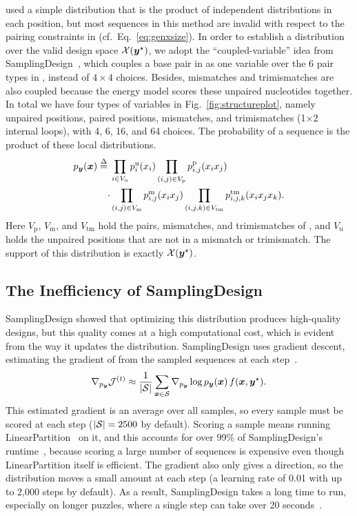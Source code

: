 \citet{matthies2023} used a simple distribution that is the product of independent distributions in each position, but most sequences in this method are invalid with respect to the pairing constraints in \vecystar (cf.~Eq.~\ref{eq:genxsize}).
In order to establish a distribution over the valid design space
$\mathcal{X}(\boldsymbol{{y}}^\star)$,
we adopt the ``coupled-variable'' idea 
from SamplingDesign~\citep{tang2026}, which couples a base pair in \vecystar as one variable over the 6 pair types in \pairset,
instead of
 $4\times 4$ choices.
Besides, mismatches and trimismatches are also coupled because the energy model scores these unpaired nucleotides together. 
In total we have
four types of variables in Fig.~\ref{fig:structureplot}, namely unpaired positions, paired positions, mismatches, and trimismatches (1$\times$2 internal loops), with 4, 6, 16, and 64 choices.
The probability of a sequence is the product of these local distributions.
\begin{equation}
\begin{aligned}
p_{\boldsymbol{{y}}}(\boldsymbol{{x}})\stackrel{\Delta}{=}{}&\prod_{i\in V_{\mathrm{u}}}p^{\mathrm{u}}_i(x_i)\prod_{(i,j)\in V_{\mathrm{p}}}p^{\mathrm{p}}_{i,j}(x_ix_j)\\
\cdot{}&\prod_{(i,j)\in V_{\mathrm{m}}}p^{\mathrm{m}}_{i,j}(x_ix_j)\prod_{(i,j,k)\in V_{\mathrm{tm}}}p^{\mathrm{tm}}_{i,j,k}(x_ix_jx_k).
\end{aligned}
\label{eq:factorization}
\end{equation}
Here $V_{\mathrm{p}}$, $V_{\mathrm{m}}$, and $V_{\mathrm{tm}}$ hold the pairs, mismatches, and trimismatches of \vecystar, and $V_{\mathrm{u}}$ holds the unpaired positions that are not in a mismatch or trimismatch. 
The support of this distribution is exactly $\mathcal{X}(\boldsymbol{{y}}^\star)$.

\subsection{The Inefficiency of SamplingDesign}\label{sec:samplingdesign}
SamplingDesign showed that optimizing this distribution produces high-quality designs, but this quality comes at a high computational cost, which is evident from the way it updates the distribution. SamplingDesign uses gradient descent, estimating the gradient of \obj from the sampled sequences at each step~\citep{tang2026}.
\begin{equation}
\nabla_{p_{\boldsymbol{{y}}}}\mathcal{J}^{(t)}\approx\frac{1}{|\mathcal{S}|}\sum_{\boldsymbol{{x}}\in\mathcal{S}}\nabla_{p_{\boldsymbol{{y}}}}\log p_{\boldsymbol{{y}}}(\boldsymbol{{x}})\,f(\boldsymbol{{x}},\boldsymbol{{y}}^\star).
\label{eq:gradient}
\end{equation}
This estimated gradient is an average over all samples, so every sample must be scored at each step ($|\mathcal{S}|=2500$ by default). Scoring a sample means running LinearPartition~\citep{zhang2020} on it, and this accounts for over 99\% of SamplingDesign's runtime~\citep{tang2026}, because scoring a large number of sequences is expensive even though LinearPartition itself is efficient. The gradient also only gives a direction, so the distribution moves a small amount at each step (a learning rate of 0.01 with up to 2,000 steps by default). As a result, SamplingDesign takes a long time to run, especially on longer puzzles, where a single step can take over 20 seconds~\citep{tang2026}.


